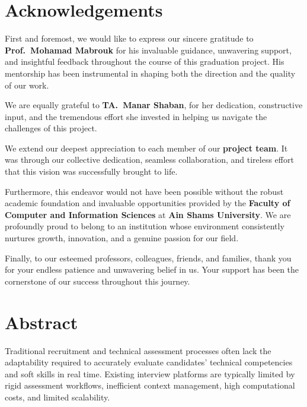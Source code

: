 \documentclass[12pt,a4paper,oneside]{report}
\begin{document}
\chapter*{Acknowledgements}

First and foremost, we would like to express our sincere gratitude to \textbf{Prof.\ Mohamad
Mabrouk} for his invaluable guidance, unwavering support, and insightful feedback throughout
the course of this graduation project. His mentorship has been instrumental in shaping both
the direction and the quality of our work.

We are equally grateful to \textbf{TA.\ Manar Shaban}, for her dedication, constructive input,
and the tremendous effort she invested in helping us navigate the challenges of this project.

We extend our deepest appreciation to each member of our \textbf{project team}. It was through
our collective dedication, seamless collaboration, and tireless effort that this vision was
successfully brought to life.

Furthermore, this endeavor would not have been possible without the robust academic foundation
and invaluable opportunities provided by the \textbf{Faculty of Computer and Information
Sciences} at \textbf{Ain Shams University}. We are profoundly proud to belong to an institution
whose environment consistently nurtures growth, innovation, and a genuine passion for our field.

Finally, to our esteemed professors, colleagues, friends, and families, thank you for your
endless patience and unwavering belief in us. Your support has been the cornerstone of our
success throughout this journey.

\clearpage

\chapter*{Abstract}

Traditional recruitment and technical assessment processes often lack the adaptability required
to accurately evaluate candidates' technical competencies and soft skills in real time. Existing
interview platforms are typically limited by rigid assessment workflows, inefficient context
management, high computational costs, and limited scalability.
\end{document}
